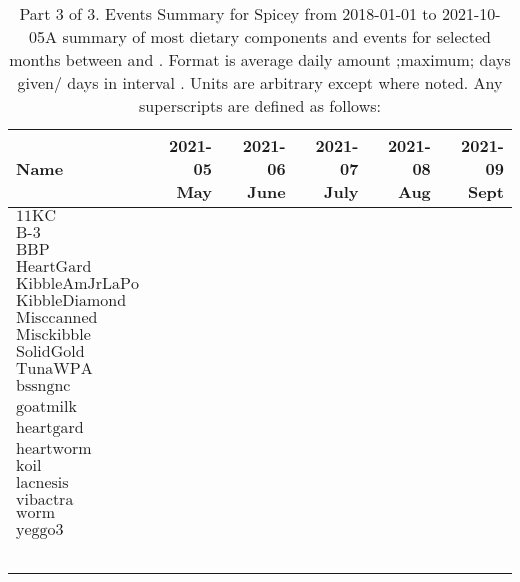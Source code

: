 \begin{table}[H]
\centering
\begin{tabular}{|l|r|r|r|r|r|}
\hline
Name&2021-05 May&2021-06 June&2021-07 July&2021-08 Aug&2021-09 Sept\\
\hline
$\textrm{11KC}$&&&&&\\
$\textrm{B-3}$&&&&&\\
$\textrm{BBP}$&&&&&\\
$\textrm{HeartGard}$&&&&&\\
$\textrm{KibbleAmJrLaPo}$&&&&&\\
$\textrm{KibbleDiamond}$&&&&&\\
$\textrm{Misccanned}$&&&&&\\
$\textrm{Misckibble}$&&&&&\\
$\textrm{SolidGold}$&&&&&\\
$\textrm{TunaWPA}$&&&&&\\
$\textrm{bssngnc}$&&&&&\\
$\textrm{goatmilk}$&&&&&\\
$\textrm{heartgard}$&&&&&\\
$\textrm{heartworm}$&&&&&\\
$\textrm{koil}$&&&&&\\
$\textrm{lacnesis}$&&&&&\\
$\textrm{vibactra}$&&&&&\\
$\textrm{worm}$&&&&&\\
$\textrm{yeggo3}$&&&&&\\
&&&&&\\
&&&&&\\
&&&&&\\
&&&&&\\
&&&&&\\
\hline
\end{tabular}
\caption{Part 3 of 3.  Events Summary for Spicey   from 2018-01-01 to 2021-10-05A summary of most dietary components and events  for selected months between \mjmdatemin and \mjmdatemax. Format is average daily amount ;maximum; days given/ days in interval . Units are arbitrary except where noted. Any  superscripts are defined as follows:  \mjmsuperscripts}
\end{table}
